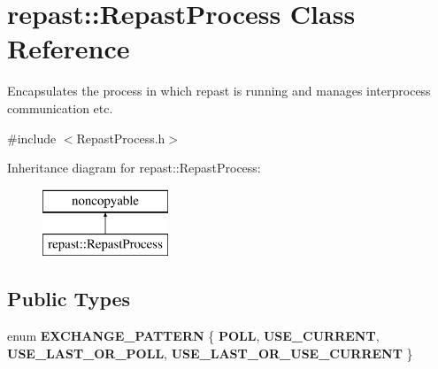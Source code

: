\hypertarget{classrepast_1_1_repast_process}{\section{repast\-:\-:Repast\-Process Class Reference}
\label{classrepast_1_1_repast_process}
}


Encapsulates the process in which repast is running and manages interprocess communication etc.  




{\ttfamily \#include $<$Repast\-Process.\-h$>$}

Inheritance diagram for repast\-:\-:Repast\-Process\-:\begin{figure}[H]
\begin{center}
\leavevmode
\includegraphics[height=2.000000cm]{classrepast_1_1_repast_process}
\end{center}
\end{figure}
\subsection*{Public Types}
\begin{DoxyCompactItemize}
\item 
enum {\bfseries E\-X\-C\-H\-A\-N\-G\-E\-\_\-\-P\-A\-T\-T\-E\-R\-N} \{ {\bfseries P\-O\-L\-L}, 
{\bfseries U\-S\-E\-\_\-\-C\-U\-R\-R\-E\-N\-T}, 
{\bfseries U\-S\-E\-\_\-\-L\-A\-S\-T\-\_\-\-O\-R\-\_\-\-P\-O\-L\-L}, 
{\bfseries U\-S\-E\-\_\-\-L\-A\-S\-T\-\_\-\-O\-R\-\_\-\-U\-S\-E\-\_\-\-C\-U\-R\-R\-E\-N\-T}
 \}
\end{DoxyCompactItemize}
